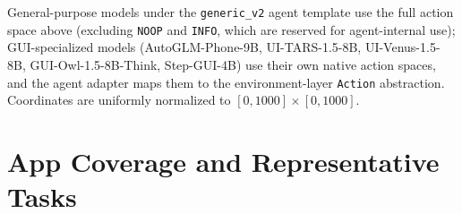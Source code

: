 General-purpose models under the \texttt{generic\_v2} agent template use the full action space above (excluding \texttt{NOOP} and \texttt{INFO}, which are reserved for agent-internal use); GUI-specialized models (AutoGLM-Phone-9B, UI-TARS-1.5-8B, UI-Venus-1.5-8B, GUI-Owl-1.5-8B-Think, Step-GUI-4B) use their own native action spaces, and the agent adapter maps them to the \sys{} environment-layer \texttt{Action} abstraction. Coordinates are uniformly normalized to $[0,1000] \times [0,1000]$.


\section{App Coverage and Representative Tasks}\label{app:apps}

